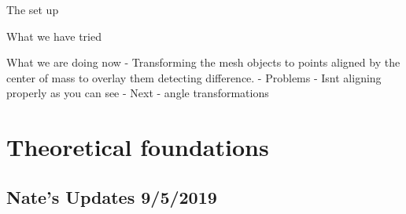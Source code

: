 \documentclass[]{book}
\begin{document}
The set up

What we have tried

What we are doing now
- Transforming the mesh objects to points aligned by the center of mass to overlay them detecting difference.
- Problems
- Isnt aligning properly as you can see
- Next
- angle transformations

\hypertarget{theoretical-foundations}{%
\chapter{Theoretical foundations}\label{theoretical-foundations}}

\hypertarget{nates-updates-952019}{%
\section{Nate's Updates 9/5/2019}\label{nates-updates-952019}}
\end{document}
